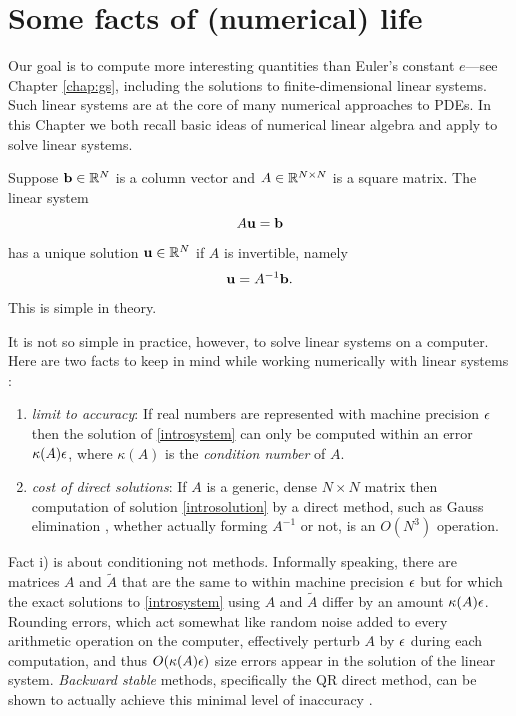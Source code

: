 \section{Some facts of (numerical) life}

Our goal is to compute more interesting quantities than Euler's constant $e$---see Chapter \ref{chap:gs}, including the solutions to finite-dimensional linear systems.  Such linear systems are at the core of many numerical approaches to PDEs.  In this Chapter we both recall basic ideas of numerical linear algebra and apply \PETSc to solve linear systems.

Suppose $\mathbf{b}\in \mathbb{R}^{N}$ is a column vector and $A\in\mathbb{R}^{N\times N}$ is a square matrix.  The linear system
\begin{equation}
A \mathbf{u} = \mathbf{b} \label{introsystem}
\end{equation}
has a unique solution $\mathbf{u}\in \mathbb{R}^{N}$ if $A$ is invertible, namely
\begin{equation}
\mathbf{u} = A^{-1} \mathbf{b}. \label{introsolution}
\end{equation}
This is simple in theory.

It is not so simple in practice, however, to solve linear systems on a computer.  Here are two facts to keep in mind while working numerically with linear systems \citep{TrefethenBau1997}:
\renewcommand{\labelenumi}{\roman{enumi})}
\begin{enumerate}
\item \label{limittoaccuracy} \emph{limit to accuracy}:  If real numbers are represented with machine precision $\epsilon$ then the solution of \eqref{introsystem} can only be computed within an error $\kappa(A) \epsilon$, where $\kappa(A)$ is the \emph{condition number} of $A$.
\item \emph{cost of direct solutions}:  If $A$ is a generic, dense $N\times N$ matrix then computation of solution \eqref{introsolution} by a direct method, such as Gauss elimination \citep{TrefethenBau1997}, whether actually forming $A^{-1}$ or not, is an $O(N^3)$ operation.
\end{enumerate}

Fact i) is about conditioning not methods.  Informally speaking, there are matrices $A$ and $\tilde A$ that are the same to within machine precision $\epsilon$ but for which the exact solutions to \eqref{introsystem} using $A$ and $\tilde A$ differ by an amount $\kappa(A) \epsilon$.  Rounding errors, which act somewhat like random noise added to every arithmetic operation on the computer, effectively perturb $A$ by $\epsilon$ during each computation, and thus $O(\kappa(A) \epsilon)$ size errors appear in the solution of the linear system.  \emph{Backward stable} methods, specifically the QR direct method, can be shown to actually achieve this minimal level of inaccuracy \citep{TrefethenBau1997}.

